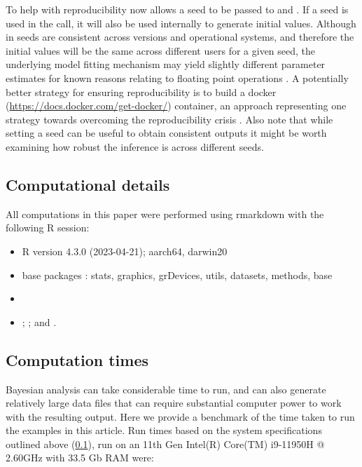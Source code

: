 \documentclass[
  shortnames]{jss}
\begin{document}
To help with reproducibility  now allows a seed to be passed to  and . If a seed is used in the  call, it will also be used internally to generate initial values. Although in  seeds are consistent across versions and operational systems, and therefore the initial values will be the same across different users for a given seed, the underlying  model fitting mechanism may yield slightly different parameter estimates for known reasons relating to floating point operations \citep[see chapter 20 in][]{stan2021}. A potentially better strategy for ensuring reproducibility is to build a docker (\url{https://docs.docker.com/get-docker/}) container, an approach representing one strategy towards overcoming the reproducibility crisis \citep{Baker2016}. Also note that while setting a seed can be useful to obtain consistent outputs it might be worth examining how robust the inference is across different seeds.

\subsection[Computational detail]{Computational details}\label{compdetails}

All computations in this paper were performed using rmarkdown \citep{allaire2023} with the following
R session:

\begin{itemize}
\item
  R version 4.3.0 (2023-04-21); aarch64, darwin20
\item
  base packages \citep{rcore}: stats, graphics, grDevices, utils, datasets, methods, base
\item
   \citep{bayesnec2103}
\item
   \citep{Burkner2017};  \citep{ggplot}; and  \citep{rcpp}.
\end{itemize}

\hypertarget{computation-times}{%
\subsection{Computation times}\label{computation-times}}

Bayesian analysis can take considerable time to run, and can also generate relatively large data files that can require substantial computer power to work with the resulting output. Here we provide a benchmark of the time taken to run the examples in this article. Run times based on the system specifications outlined above (\ref{compdetails}), run on an 11th Gen Intel(R) Core(TM) i9-11950H @ 2.60GHz with 33.5 Gb RAM were:
\end{document}
